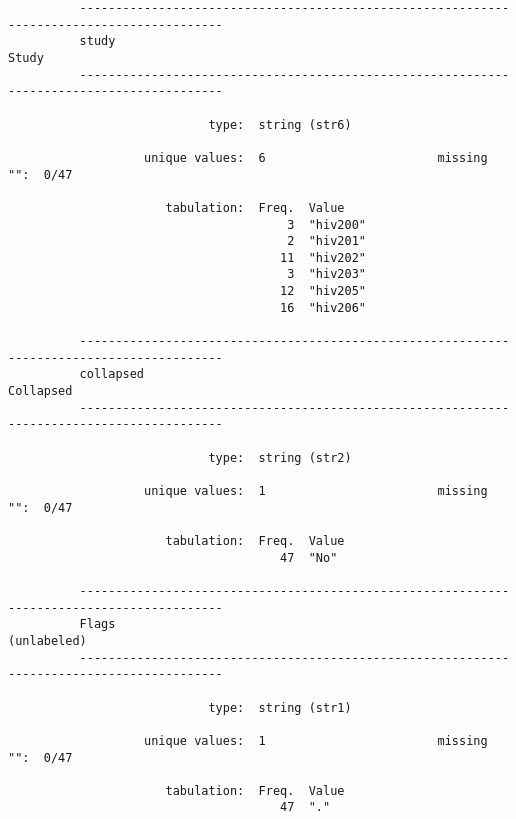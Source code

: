 \documentclass{article}
\begin{document}
\begin{verbatim}
          
          
          
          ------------------------------------------------------------------------------------------
          study                                                                                Study
          ------------------------------------------------------------------------------------------
          
                            type:  string (str6)
          
                   unique values:  6                        missing "":  0/47
          
                      tabulation:  Freq.  Value
                                       3  "hiv200"
                                       2  "hiv201"
                                      11  "hiv202"
                                       3  "hiv203"
                                      12  "hiv205"
                                      16  "hiv206"
          
          ------------------------------------------------------------------------------------------
          collapsed                                                                        Collapsed
          ------------------------------------------------------------------------------------------
          
                            type:  string (str2)
          
                   unique values:  1                        missing "":  0/47
          
                      tabulation:  Freq.  Value
                                      47  "No"
          
          ------------------------------------------------------------------------------------------
          Flags                                                                          (unlabeled)
          ------------------------------------------------------------------------------------------
          
                            type:  string (str1)
          
                   unique values:  1                        missing "":  0/47
          
                      tabulation:  Freq.  Value
                                      47  "."
          

\end{verbatim}
\end{document}

